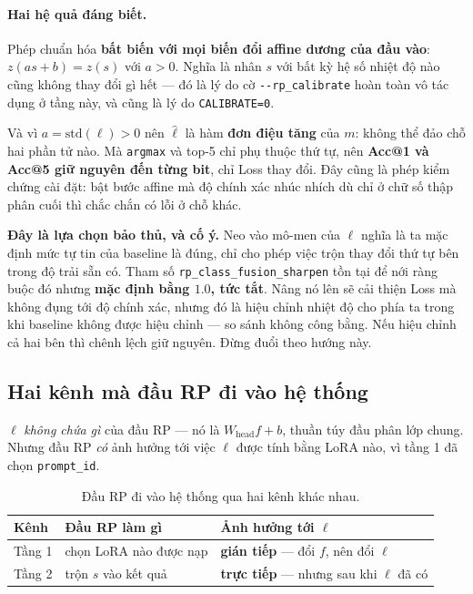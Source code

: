 \documentclass[11pt,a4paper]{article}
\newenvironment{luuy}{\begin{leftbar}\noindent\ignorespaces}{\end{leftbar}}
\begin{document}
\paragraph{Hai hệ quả đáng biết.}
Phép chuẩn hóa \textbf{bất biến với mọi biến đổi affine dương của đầu vào}:
$z(as + b) = z(s)$ với $a > 0$. Nghĩa là nhân $s$ với bất kỳ hệ số nhiệt độ nào
cũng không thay đổi gì hết --- đó là lý do cờ \texttt{-{}-rp\_calibrate} hoàn
toàn vô tác dụng ở tầng này, và cũng là lý do \texttt{CALIBRATE=0}.

Và vì $a = \mathrm{std}(\ell) > 0$ nên $\hat\ell$ là hàm \textbf{đơn điệu tăng}
của $m$: không thể đảo chỗ hai phần tử nào. Mà \texttt{argmax} và top-5 chỉ phụ
thuộc thứ tự, nên \textbf{Acc@1 và Acc@5 giữ nguyên đến từng bit}, chỉ Loss thay
đổi. Đây cũng là phép kiểm chứng cài đặt: bật bước affine mà độ chính xác nhúc
nhích dù chỉ ở chữ số thập phân cuối thì chắc chắn có lỗi ở chỗ khác.

\begin{luuy}
\textbf{Đây là lựa chọn bảo thủ, và cố ý.} Neo vào mô-men của $\ell$ nghĩa là ta
mặc định mức tự tin của baseline là đúng, chỉ cho phép việc trộn thay đổi thứ tự
bên trong độ trải sẵn có. Tham số \texttt{rp\_class\_fusion\_sharpen} tồn tại để
nới ràng buộc đó nhưng \textbf{mặc định bằng $1.0$, tức tắt}. Nâng nó lên sẽ cải
thiện Loss mà không đụng tới độ chính xác, nhưng đó là hiệu chỉnh nhiệt độ cho
phía ta trong khi baseline không được hiệu chỉnh --- so sánh không công bằng. Nếu
hiệu chỉnh cả hai bên thì chênh lệch giữ nguyên. Đừng đuổi theo hướng này.
\end{luuy}

\subsection{Hai kênh mà đầu RP đi vào hệ thống}
\label{sec:hai-kenh}

$\ell$ \emph{không chứa gì} của đầu RP --- nó là $W_{\mathrm{head}} f + b$, thuần
túy đầu phân lớp chung. Nhưng đầu RP \emph{có} ảnh hưởng tới việc $\ell$ được
tính bằng LoRA nào, vì tầng 1 đã chọn \texttt{prompt\_id}.

\begin{table}[htbp]
\centering
\caption{Đầu RP đi vào hệ thống qua hai kênh khác nhau.}
\label{tab:hai-kenh}
\begin{tabular}{@{}llp{5.6cm}@{}}
\toprule
Kênh & Đầu RP làm gì & Ảnh hưởng tới $\ell$ \\
\midrule
Tầng 1 & chọn LoRA nào được nạp
       & \textbf{gián tiếp} --- đổi $f$, nên đổi $\ell$ \\
Tầng 2 & trộn $s$ vào kết quả
       & \textbf{trực tiếp} --- nhưng sau khi $\ell$ đã có \\
\bottomrule
\end{tabular}
\end{table}
\end{document}
